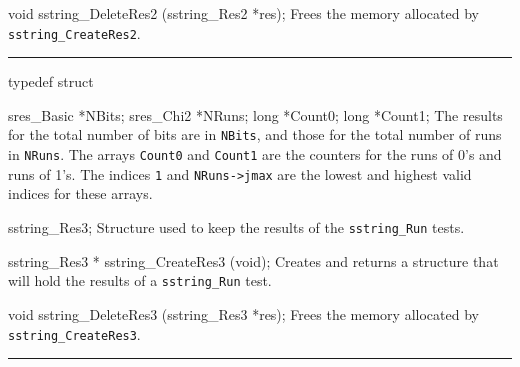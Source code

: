 void sstring_DeleteRes2 (sstring_Res2 *res);
\endcode
 \tab
  Frees the memory allocated by {\tt sstring\_CreateRes2}.
 \endtab


\bigskip\hrule
\code


typedef struct {

   sres_Basic *NBits;
   sres_Chi2 *NRuns;
   long *Count0;
   long *Count1;
\endcode
 \tabb
  The results for the total number of bits are in {\tt NBits},
  and those for the total number of runs in {\tt NRuns}.
  The arrays {\tt Count0} and  {\tt Count1} are the counters for the
  runs of 0's and runs of 1's.
  The indices {\tt 1} and {\tt NRuns->jmax} are the lowest
  and highest valid indices for these arrays.
 \endtabb
\code

} sstring_Res3;
\endcode
 \tab
  Structure used to keep the results of the {\tt sstring\_Run} tests.
 \endtab
\code


sstring_Res3 * sstring_CreateRes3 (void);
\endcode
 \tab
  Creates and returns a structure that will hold the results
  of a  {\tt sstring\_Run} test.
 \endtab
\code


void sstring_DeleteRes3 (sstring_Res3 *res);
\endcode
 \tab
  Frees the memory allocated by {\tt sstring\_CreateRes3}.
 \endtab


\bigskip\hrule
\code



